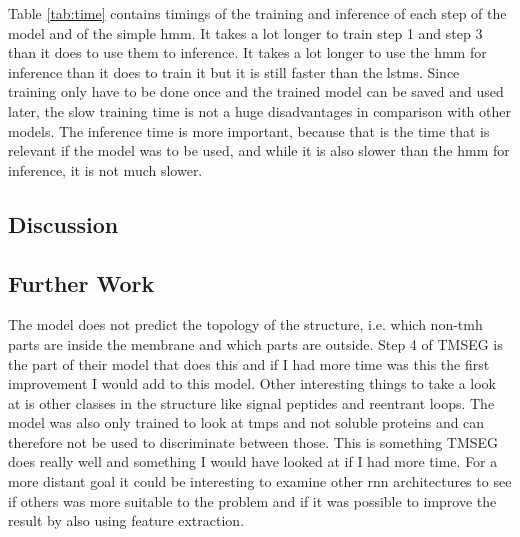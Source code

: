 Table \ref{tab:time} contains timings of the training and inference of each 
step of the model and of the simple \gls{hmm}. It takes a lot longer to train 
step 1 and step 3 than it does to use them to inference. 
It takes a lot longer to use the \gls{hmm} for inference than it does to train
it but it is still faster than the \glspl{lstm}. Since training only have to be
done once and the trained model can be saved and used later, the slow training 
time is not a huge disadvantages in comparison with other models. The inference
time is more important, because that is the time that is relevant if the model 
was to be used, and while it is also slower than the \gls{hmm} for inference,
it is not much slower.

\subsection{Discussion}


\subsection{Further Work}
The model does not predict the topology of the structure, i.e. which 
non-\gls{tmh} parts are inside the membrane and which parts are outside.
Step 4 of TMSEG is the part of their model that does this and if I had more
time was this the first improvement I would add to this model.
Other interesting things to take a look at is other classes in the 
structure like signal peptides and reentrant loops. 
The model was also only trained to look at \glspl{tmp} and not 
soluble proteins and can therefore not be used to discriminate 
between those. This is something TMSEG does really well and 
something I would have looked at if I had more time.
For a more distant goal it could be interesting to examine other \gls{rnn}
architectures to see if others was more suitable to the problem and
if it was possible to improve the result by also using feature extraction.



